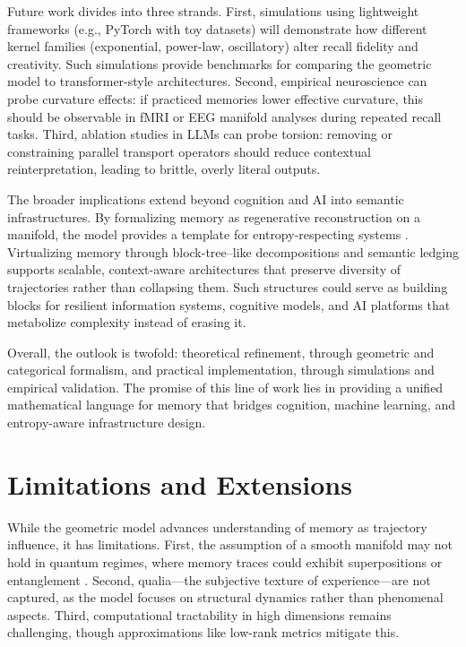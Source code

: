 \documentclass[a4paper,12pt]{article}
\begin{document}
Future work divides into three strands. First, simulations using lightweight frameworks 
(e.g., PyTorch with toy datasets) will demonstrate how different kernel families 
(exponential, power-law, oscillatory) alter recall fidelity and creativity. Such 
simulations provide benchmarks for comparing the geometric model to transformer-style 
architectures. Second, empirical neuroscience can probe curvature effects: if practiced 
memories lower effective curvature, this should be observable in fMRI or EEG manifold 
analyses during repeated recall tasks. Third, ablation studies in LLMs can probe torsion: 
removing or constraining parallel transport operators should reduce contextual 
reinterpretation, leading to brittle, overly literal outputs.

The broader implications extend beyond cognition and AI into semantic infrastructures. 
By formalizing memory as regenerative reconstruction on a manifold, the model provides a 
template for entropy-respecting systems \citep{semantic2025}. Virtualizing memory through 
block-tree–like decompositions and semantic ledging supports scalable, context-aware 
architectures that preserve diversity of trajectories rather than collapsing them. Such 
structures could serve as building blocks for resilient information systems, cognitive 
models, and AI platforms that metabolize complexity instead of erasing it.

Overall, the outlook is twofold: theoretical refinement, through geometric and categorical 
formalism, and practical implementation, through simulations and empirical validation. 
The promise of this line of work lies in providing a unified mathematical language for 
memory that bridges cognition, machine learning, and entropy-aware infrastructure design.

\section{Limitations and Extensions}
While the geometric model advances understanding of memory as trajectory influence, it 
has limitations. First, the assumption of a smooth manifold may not hold in quantum regimes, 
where memory traces could exhibit superpositions or entanglement \citep{penrose1989road}. 
Second, qualia—the subjective texture of experience—are not captured, as the model focuses 
on structural dynamics rather than phenomenal aspects. Third, computational tractability 
in high dimensions remains challenging, though approximations like low-rank metrics 
mitigate this.
\end{document}
